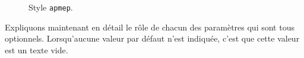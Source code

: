 \documentclass[12pt,a4paper]{scrartcl}
\theoremstyle{definition}
\begin{document}
\begin{figure}[!tbp]
  \setlength{\fboxrule}{1.5pt}
  \centering
  \hfill
  \caption{Style \texttt{apmep}.}
  \label{style:apmep}
\end{figure}

Expliquons maintenant en détail le rôle de chacun des paramètres qui sont tous optionnels. Lorsqu'aucune valeur par défaut n'est indiquée, c'est que cette valeur est un texte vide.
\end{document}
